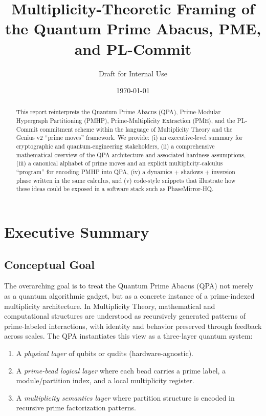 \documentclass[11pt]{article}
\title{Multiplicity-Theoretic Framing of the Quantum Prime Abacus, PME, and PL-Commit}
\author{Draft for Internal Use}
\date{\today}
\begin{document}
\maketitle

\begin{abstract}
This report reinterprets the Quantum Prime Abacus (QPA), Prime-Modular Hypergraph Partitioning (PMHP), Prime-Multiplicity Extraction (PME), and the PL-Commit commitment scheme within the language of Multiplicity Theory and the Genius v2 ``prime moves'' framework. We provide: (i) an executive-level summary for cryptographic and quantum-engineering stakeholders, (ii) a comprehensive mathematical overview of the QPA architecture and associated hardness assumptions, (iii) a canonical alphabet of prime moves and an explicit multiplicity-calculus ``program'' for encoding PMHP into QPA, (iv) a dynamics + shadows + inversion phase written in the same calculus, and (v) code-style snippets that illustrate how these ideas could be exposed in a software stack such as PhaseMirror-HQ.
\end{abstract}

\tableofcontents

\section{Executive Summary}

\subsection{Conceptual Goal}

The overarching goal is to treat the Quantum Prime Abacus (QPA) not merely as a quantum algorithmic gadget, but as a concrete instance of a prime-indexed multiplicity architecture. In Multiplicity Theory, mathematical and computational structures are understood as recursively generated patterns of prime-labeled interactions, with identity and behavior preserved through feedback across scales. The QPA instantiates this view as a three-layer quantum system:

\begin{enumerate}[label=(\alph*)]
  \item A \emph{physical layer} of qubits or qudits (hardware-agnostic).
  \item A \emph{prime-bead logical layer} where each bead carries a prime label, a module/partition index, and a local multiplicity register.
  \item A \emph{multiplicity semantics layer} where partition structure is encoded in recursive prime factorization patterns.
\end{enumerate}
\end{document}
